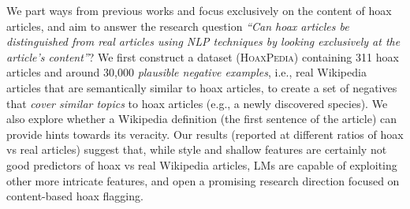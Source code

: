 We part ways from previous works and focus exclusively on the content of hoax articles, and aim to answer the research question \emph{``Can hoax articles be distinguished from real articles using NLP techniques by looking exclusively at the article's content''}? We first construct a dataset (\textsc{HoaxPedia}) containing 311 hoax articles and around 30,000 \textit{plausible negative examples}, i.e., real Wikipedia articles that are semantically similar to hoax articles, to create a set of negatives that \textit{cover similar topics} to hoax articles (e.g., a newly discovered species). We also explore whether a Wikipedia definition (the first sentence of the article) can provide hints towards its veracity. Our results (reported at different ratios of hoax vs real articles) suggest that, while style and shallow features are certainly not good predictors of hoax vs real Wikipedia articles, LMs are capable of exploiting other more intricate features, and open a promising research direction focused on content-based hoax flagging. 
